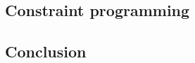 \chapter{}
\label{cha:CS}
\label{CS:Intro}

\section{Constraint programming}
\label{CS:CP}


\section{Conclusion}
\label{CS:conclusion}

